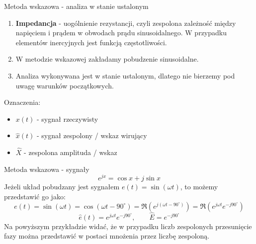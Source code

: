 
\begin{frame}{Metoda wskazowa - analiza w stanie ustalonym}
	\begin{enumerate}
		\item[\bt] \textbf{Impedancja} - uogólnienie rezystancji, czyli zespolona zależność między napięciem i prądem w obwodach prądu sinusoidalnego.
		      W przypadku elementów inercyjnych jest funkcją częstotliwości.
		\item[\bt] W metodzie wskazowej zakładamy pobudzenie sinusoidalne.
		\item[\bt] Analiza wykonywana jest w stanie ustalonym, dlatego nie bierzemy pod uwagę warunków początkowych.
	\end{enumerate}
	Oznaczenia:
	\begin{itemize}
		\item[\bt] $x(t)$ - sygnał rzeczywisty
		\item[\bt] $\hat{x}(t)$ - sygnał zespolony / wskaz wirujący
		\item[\bt] $\hat{X}$ - zespolona amplituda / wskaz
	\end{itemize}
\end{frame}

\begin{frame}{Metoda wskazowa - sygnały}
	\begin{equation*}
		e^{jx} = \cos x + j \sin x
	\end{equation*}
	Jeżeli układ pobudzany jest sygnałem $e(t)=\sin(\omega t)$, to możemy przedstawić go jako:
	\begin{equation*}
		e(t)=\sin(\omega t) = \cos(\omega t - 90^{\circ}) = \Re \left( e^{j(\omega t - 90^{\circ})} \right) = \Re \left( e^{j\omega t} e^{-j90^{\circ}} \right)
	\end{equation*}
	\begin{equation*}
		\hat{e}(t) = e^{j\omega t} e^{-j90^{\circ}}, \qquad \hat{E}= e^{-j90^{\circ}}
	\end{equation*}
	Na powyższym przykładzie widać, że w przypadku liczb zespolonych przesunięcie fazy można przedstawić w postaci mnożenia przez liczbę zespoloną.
\end{frame}

